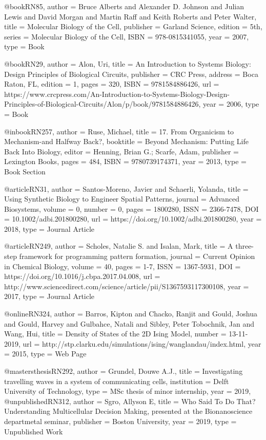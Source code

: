 @book{RN85,
   author = {Bruce Alberts and Alexander D. Johnson and Julian Lewis and David Morgan and Martin Raff and Keith Roberts and Peter Walter},
   title = {Molecular Biology of the Cell},
   publisher = {Garland Science},
   edition = {5th},
   series = {Molecular Biology of the Cell},
   ISBN = {978-0815341055},
   year = {2007},
   type = {Book}
}

@book{RN29,
   author = {Alon, Uri},
   title = {An Introduction to Systems Biology: Design Principles of Biological Circuits},
   publisher = {CRC Press},
   address = {Boca Raton, FL},
   edition = {1},
   pages = {320},
   ISBN = {9781584886426},
   url = {https://www.crcpress.com/An-Introduction-to-Systems-Biology-Design-Principles-of-Biological-Circuits/Alon/p/book/9781584886426},
   year = {2006},
   type = {Book}
}

@inbook{RN257,
   author = {Ruse, Michael},
   title = {17. From Organicism to Mechanism-and Halfway Back?},
   booktitle = {Beyond Mechanism: Putting Life Back Into Biology},
   editor = {Henning, Brian G.; Scarfe, Adam},
   publisher = {Lexington Books},
   pages = {484},
   ISBN = {9780739174371},
   year = {2013},
   type = {Book Section}
}

@article{RN31,
   author = {Santos-Moreno, Javier and Schaerli, Yolanda},
   title = {Using Synthetic Biology to Engineer Spatial Patterns},
   journal = {Advanced Biosystems},
   volume = {0},
   number = {0},
   pages = {1800280},
   ISSN = {2366-7478},
   DOI = {10.1002/adbi.201800280},
   url = {https://doi.org/10.1002/adbi.201800280},
   year = {2018},
   type = {Journal Article}
}

@article{RN249,
   author = {Scholes, Natalie S. and Isalan, Mark},
   title = {A three-step framework for programming pattern formation},
   journal = {Current Opinion in Chemical Biology},
   volume = {40},
   pages = {1-7},
   ISSN = {1367-5931},
   DOI = {https://doi.org/10.1016/j.cbpa.2017.04.008},
   url = {http://www.sciencedirect.com/science/article/pii/S1367593117300108},
   year = {2017},
   type = {Journal Article}
}

@online{RN324,
   author = {Barros, Kipton and Chacko, Ranjit and Gould, Joshua and Gould, Harvey and Gulbahce, Natali and Sibley, Peter Tobochnik, Jan and Wang, Hui},
   title = {Density of States of the 2D Ising Model},
   number = {13-11-2019},
   url = {http://stp.clarku.edu/simulations/ising/wanglandau/index.html},
   year = {2015},
   type = {Web Page}
}

@mastersthesis{RN292,
   author = {Grundel, Douwe A.J.},
   title = {Investigating travelling waves in a system of communicating cells},
   institution = {Delft University of Technology},
   type = {MSc thesis of minor internship},
   year = {2019},
}
@unpublished{RN312,
   author = {Sgro, Allyson E},
   title = {Who Said To Do That? Understanding Multicellular Decision Making, presented at the Bionanoscience departmetal seminar},
   publisher = {Boston University},
   year = {2019},
   type = {Unpublished Work}
}